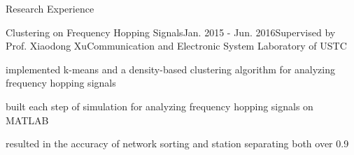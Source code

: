 \documentclass{resume} %
\begin{document}
\begin{rSection}{Research Experience}

\begin{rSubsection}{Clustering on Frequency Hopping Signals}{Jan. 2015 - Jun. 2016}{Supervised by Prof. Xiaodong Xu}{Communication and Electronic System Laboratory of USTC}
\item implemented k-means and a density-based clustering algorithm for analyzing frequency hopping signals
\item built each step of simulation for analyzing frequency hopping signals on MATLAB
\item resulted in the accuracy of network sorting and station separating both over 0.9 
\end{rSubsection}








\end{rSection}
\end{document}
